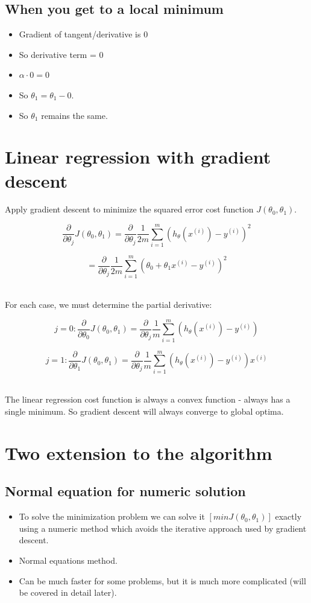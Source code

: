 \documentclass{article}
\begin{document}
\subsection*{When you get to a local minimum}
\begin{itemize}
  \item Gradient of tangent/derivative is 0
  \item So derivative term = 0
  \item $\alpha \cdot 0 = 0$
  \item So $\theta_1 = \theta_1 - 0$.
  \item So $\theta_1$ remains the same.
\end{itemize}

\section*{Linear regression with gradient descent}

Apply gradient descent to minimize the squared error cost function $J(\theta_0, \theta_1)$.

$$\frac{\partial}{\partial \theta_j} J(\theta_0, \theta_1) = \frac{\partial}{\partial \theta_j} \frac{1}{2m} \sum_{i=1}^{m} (h_{\theta}(x^{(i)}) - y^{(i)})^2$$

$$= \frac{\partial}{\partial \theta_j} \frac{1}{2m} \sum_{i=1}^{m} (\theta_0 + \theta_1x^{(i)} - y^{(i)})^2$$

~\\
For each case, we must determine the partial derivative:

$$j=0:\frac{\partial}{\partial \theta_0} J(\theta_0, \theta_1)=\frac{\partial}{\partial \theta_j} \frac{1}{m} \sum_{i=1}^{m} (h_{\theta}(x^{(i)}) - y^{(i)})$$

$$j=1:\frac{\partial}{\partial \theta_1} J(\theta_0, \theta_1)=\frac{\partial}{\partial \theta_j} \frac{1}{m} \sum_{i=1}^{m} (h_{\theta}(x^{(i)}) - y^{(i)})x^{(i)}$$

~\\
The linear regression cost function is always a convex function - always has a single minimum. So gradient descent will always converge to global optima.

\section*{Two extension to the algorithm}

\subsection*{Normal equation for numeric solution}
\begin{itemize}
  \item To solve the minimization problem we can solve it $[ min J(\theta_0, \theta_1) ]$ exactly using a numeric method which avoids the iterative approach used by gradient descent.
  \item Normal equations method.
  \item Can be much faster for some problems, but it is much more complicated (will be covered in detail later).
\end{itemize}
\end{document}
